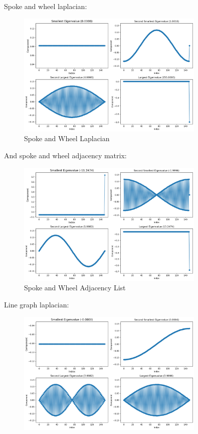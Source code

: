 \documentclass[12pt]{article}
\begin{document}
\begin{enumerate}[leftmargin=\labelsep, label=(\alph*)]
        Spoke and wheel laplacian:
        \begin{figure}[H]
            \centering
            \includegraphics[width=0.8\textwidth]{spoke_L.png}
            \caption{Spoke and Wheel Laplacian}
        \end{figure}
        And spoke and wheel adjacency matrix:
        \begin{figure}[H]
            \centering
            \includegraphics[width=0.8\textwidth]{spoke_A.png}
            \caption{Spoke and Wheel Adjacency List}
        \end{figure}
        Line graph laplacian:
        \begin{figure}[H]
            \centering
            \includegraphics[width=0.8\textwidth]{line_L.png}

\end{figure}
\end{enumerate}
\end{document}
